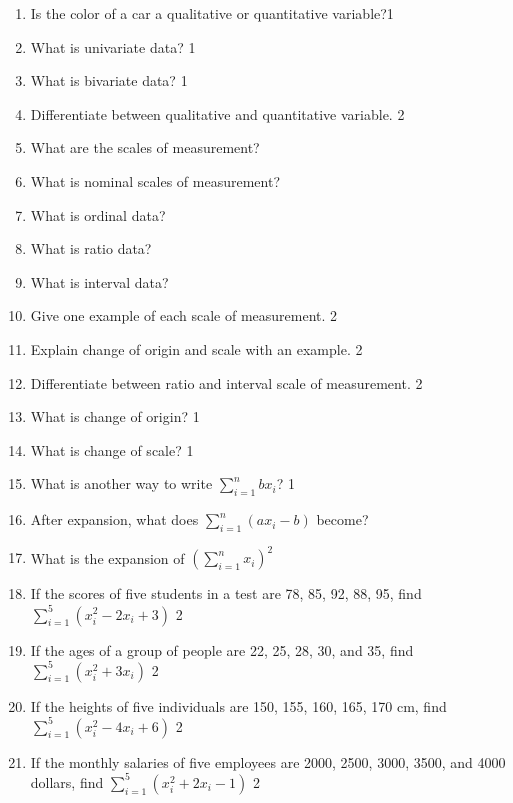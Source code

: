 \documentclass[a4paper,oneside]{book}
\begin{document}
\begin{enumerate}
\item Is the color of a car a qualitative or quantitative variable?\hfill 1

\item What is univariate data? \hfill 1

\item What is bivariate data? \hfill 1

\item Differentiate between qualitative and quantitative variable. \hfill 2

\item What are the scales of measurement?

\item What is nominal scales of measurement?

\item What is ordinal data?

\item What is ratio data?

\item What is interval data?

\item Give one example of each scale of measurement. \hfill 2

\item Explain change of origin and scale with an example. \hfill 2

\item Differentiate between ratio and interval scale of measurement. \hfill 2

\item What is change of origin? \hfill 1

\item What is change of scale? \hfill 1

\item What is another way to write $\displaystyle \sum_{i=1}^n bx_i$?  \hfill 1

\item After expansion, what does 
$\displaystyle \sum_{i=1}^n \left( ax_i-b \right)$ become?

\item What is the expansion of $\displaystyle \left( \sum_{i=1}^n x_i\right)^2$

\item 
If the scores of five students in a test are 78, 85, 92, 88, 95, 
find $\displaystyle \sum_{i=1}^5 (x_i^2 - 2x_i + 3)$ \hfill 2

\item 
If the ages of a group of people are 22, 25, 28, 30, and 35, 
find $\displaystyle \sum_{i=1}^5 (x_i^2 + 3x_i)$ \hfill 2

\item 
If the heights of five individuals are 150, 155, 160, 165, 170 cm, 
find $\displaystyle \sum_{i=1}^5 (x_i^2 - 4x_i + 6)$ \hfill 2

\item 
If the monthly salaries of five employees are 2000, 2500, 3000, 3500, and 4000 
dollars, find $\displaystyle \sum_{i=1}^5 (x_i^2 + 2x_i - 1)$ \hfill 2


\end{enumerate}
\end{document}
